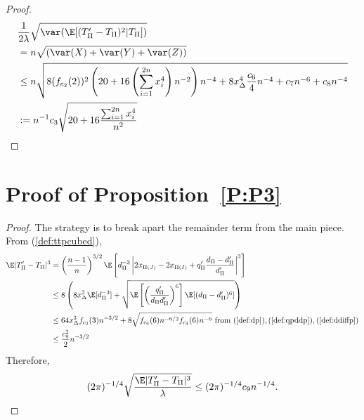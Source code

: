 \begin{proof}
  \begin{align*}
    &\frac{1}{2\lambda} \sqrt{\var (\E [(T_{\Pi}'-T_{\Pi})^2|T_{\Pi}])} \\
    &= n \sqrt{(\var(X) + \var(Y) + \var(Z))} \\
    &\leq n \sqrt{
      8(f_{c_2}(2))^2 \left ( 20 + 16 \left ( \sum_{i=1}^{2n} x_{i}^4 \right )n^{-2} \right ) n^{-4}
      + 8x_{\Delta}^4 \frac{c_6}{4} n^{-4}
      + c_7 n^{-6} + c_8 n^{-4}} \\
    &:= n^{-1} c_3\sqrt{20 + 16\frac{\sum_{i=1}^{2n} x_{i}^4}{n^2}} \\
  \end{align*}
\end{proof}

\section{Proof of Proposition~\ref{P:P3}}
\begin{proof}
  The strategy is to break apart the remainder term from the main piece.  From (\ref{def:ttpcubed}),
  \begin{align*}
    \E|T_{\Pi}'-T_{\Pi}|^3
    &= \left (\frac{n-1}{n}\right )^{3/2}
    \E \left [d_{\Pi}^{-3} \left |2x_{\Pi(J)}-2x_{\Pi(I)}+q_{\Pi}'\frac{d_{\Pi}-d_{\Pi}'}{d_{\Pi}'} \right |^3
    \right ] \\
    &\leq 8 \left (
      8 x_{\Delta}^3 \E [d_{\Pi}^{-3}] +
      \sqrt{\E \left [ \left ( \frac{q_{\Pi}'}{d_{\Pi}d_{\Pi}'} \right )^6 \right ]  \E
        [(d_{\Pi}-d_{\Pi}')^6]} \right ) \\
    &\leq 64 x_{\Delta}^3 f_{c_2}(3) n^{-3/2} +
    8 \sqrt{f_{c_6}(6) n^{-6/2} f_{c_4}(6) n^{-6}} \text{ from }
    (\ref{def:dp}),(\ref{def:qpddp}),(\ref{def:ddiffp}) \\
    &\leq \frac{c_9^2}{2} n^{-3/2}
  \end{align*}
  Therefore,
  \begin{equation*}
    (2\pi)^{-1/4}\sqrt{\frac{\E|T_{\Pi}'-T_{\Pi}|^3}{\lambda}} \leq
    (2\pi)^{-1/4} c_9 n^{-1/4}.
  \end{equation*}
\end{proof}

